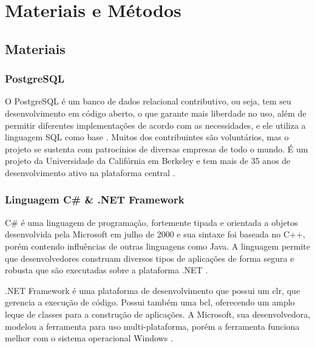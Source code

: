 \chapter{Materiais e Métodos}\label{cap:materialemetodos}

\section{Materiais}\label{sec:materiais}

\subsection{PostgreSQL}\label{subsec:postgresql}

O PostgreSQL é um banco de dados relacional contributivo, ou seja, tem seu desenvolvimento em código aberto, o que garante mais liberdade no uso, além de permitir diferentes implementações de acordo com as necessidades, e ele utiliza a linguagem SQL como base \cite{Amazon}. Muitos dos contribuintes são voluntários, mas o projeto se sustenta com patrocínios de diversas empresas de todo o mundo. É um projeto da Universidade da Califórnia em Berkeley e tem mais de 35 anos de desenvolvimento ativo na plataforma central \cite{PostgreSQL}.

\subsection{Linguagem C{\#} {\&} .NET Framework}\label{subsec:csharp}

C{\#} é uma linguagem de programação, fortemente tipada e orientada a objetos desenvolvida pela Microsoft em julho de 2000 e sua sintaxe foi baseada no C++, porém contendo influências de outras linguagens como Java. A linguagem permite que desenvolvedores construam diversos tipos de aplicações de forma segura e robusta que são executadas sobre a plataforma .NET \cite{CSharp}.

.NET Framework é uma plataforma de desenvolvimento que possui um \gls{clr}, que gerencia a execução de código. Possui também uma \gls{bcl}, oferecendo um amplo leque de classes para a construção de aplicações. A Microsoft, sua desenvolvedora, modelou a ferramenta para uso multi-plataforma, porém a ferramenta funciona melhor com o sistema operacional Windows \cite{CSharpDevelopment}.


